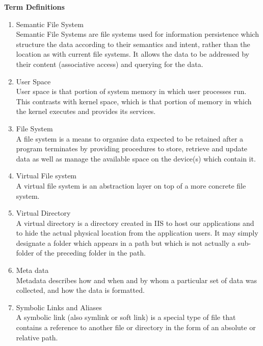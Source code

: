 \noindent \textbf{Term Definitions} \\
\begin{enumerate}
\item Semantic File System \\
Semantic File Systems are file systems used for information persistence which structure the data according to their semantics and intent, rather than the location as with current file systems. It allows the data to be addressed by their content (associative access) and querying for the data.
\item User Space \\
User space is that portion of system memory in which user processes run. This contrasts with kernel space, which is that portion of memory in which the kernel executes and provides its services.
\item File System \\
A 
file system 
is a 
means to 
organise 
data 
expected to be retained after a program 
terminates by providing procedures to store, retrieve and update data as well as 
manage the available space on the device(s) which contain it. 
\item Virtual File system \\
A virtual file system is an abstraction layer on top of a more concrete file system.
\item Virtual Directory \\
A virtual directory is a directory created in IIS to host our applications and to hide the actual physical location from the application users. 
It may simply designate a folder which appears in a path but which is not actually a sub-folder of the preceding folder in the path. 
\item Meta data \\
Metadata describes how and when and by whom a particular set of data was collected, and how the data is formatted.
\item Symbolic Links and Aliases \\
A symbolic link (also symlink or soft link) is a special type of file that contains a reference to another file or directory in the form of an absolute or relative path. 


\end{enumerate}


